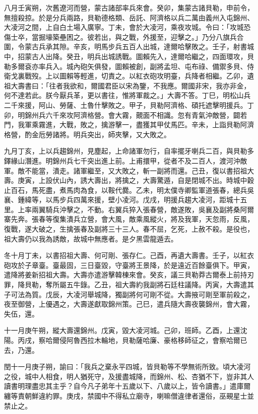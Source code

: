\begin{pinyinscope}
八月壬寅朔，次舊遼河而營，蒙古諸部率兵來會。癸卯，集蒙古諸貝勒，申前令，無擅殺掠。於是分兵兩路，貝勒德格類、岳託、阿濟格以兵二萬由義州入屯錦州、大凌河之間，上自白土場入廣寧。丁未，會於大凌河，乘夜攻城。令曰：「攻城恐傷士卒，當掘壕築壘困之。彼若出，與之戰，外援至，迎擊之。」乃分八旗兵合圍，令蒙古兵承其隙。辛亥，明馬步兵五百人出城，達爾哈擊敗之。壬子，射書城中，招蒙古人出降。癸丑，明兵出城誘戰。圖賴先入，達爾哈繼之，四面環攻，貝勒多爾袞亦率兵入。城內砲矢俱發，圖賴被創，副將孟坦、屯布祿、備禦多貝、侍衛戈裏戰歿。上以圖賴等輕進，切責之。以紅衣砲攻明臺，兵降者相繼。乙卯，遺祖大壽書曰：「往者我欲和，爾國君臣以宋為鑒，不我應。爾國非宋，我亦非金，何不達若此。朕今厭兵革，更以書往，惟將軍裁之。」大壽不答。丁巳，明松山兵二千來援，阿山、勞薩、土魯什擊敗之。甲子，貝勒阿濟格、碩托遮擊明援兵。丁卯，明錦州兵六千來攻阿濟格營。會大霧，覿面不相識。忽有青氣沖敵營，闢若門，我軍乘霧進，大戰，敗之，擒游擊一，盡獲其甲仗馬匹。辛未，上詣貝勒阿濟格營，酌金卮勞諸將。明兵突出，師夾擊，又大敗之。

九月丁亥，上以兵趨錦州，見塵起，上命諸軍勿行，自率擺牙喇兵二百，與貝勒多鐸緣山潛進。明錦州兵七千突出進上前。上甫擐甲，從者不及二百人，渡河沖敵軍。敵不能當，潰走。諸軍繼至，又大敗之，斬一副將而還。己丑，復以書招祖大壽。庚寅，上設伏山內，誘大壽出，將擒之，大壽驚遁，自是閉城不出。時城中穀止百石，馬死盡，煮馬肉為食，以鞍代爨。乙未，明太僕寺卿監軍道張春，總兵吳襄、鍾緯等，以馬步兵四萬來援，壁小凌河。戊戌，明援兵趨大凌河，距城十五里。上率兩翼騎兵沖擊之，不動。右翼兵猝入張春營，敵遂敗，吳襄及副將桑阿爾寨先奔。張春等復集潰兵立營，會大風，敵乘風縱火，將及我軍，天忽雨，反風，復戰，遂大破之，生擒張春及副將三十三人。春不屈，乞死，上赦不殺。是役也，祖大壽仍以我為誘敵，故城中無應者。是夕黑雲龍遁去。

冬十月丁未，以書招祖大壽、何可剛、張存仁。己酉，再遺大壽書。壬子，以紅衣砲攻於子章臺。臺最固，三日臺毀，守臺將王景降，於是遠近百餘臺俱下。甲寅，遣降將姜新招祖大壽。大壽亦遣游擊韓棟來會。癸亥，議三貝勒莽古爾泰上前持刃罪，降貝勒，奪所屬五牛錄。乙丑，祖大壽約我副將石廷柱議降。丙寅，大壽遣其子可法為質。戊辰，大凌河舉城降，獨副將何可剛不從。大壽掖可剛至軍前殺之，夜至御營，上優遇之，大壽遂獻取錦州策。己巳，遣兵隨大壽夜襲錦州，會大霧，失伍，還。

十一月庚午朔，縱大壽還錦州。戊寅，毀大凌河城。己卯，班師。乙酉，上還沈陽。丙戌，察哈爾侵阿魯西拉木輪地，貝勒薩哈廉、豪格移師征之，會察哈爾已去，乃還。

閏十一月庚子朔，諭曰：「我兵之棄永平四城，皆貝勒等不學無術所致。頃大凌河之役，城中人相食，明人猶死守，及援盡城降，而錦州、松、杏猶不下，豈非其人讀書明理盡忠其主乎？自今凡子弟年十五歲以下、八歲以上，皆令讀書。」遣庫爾纏等責朝鮮違約罪。庚戌，禁國中不得私立廟寺，喇嘛僧違律者還俗，巫覡星士並禁止之。


\end{pinyinscope}
